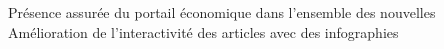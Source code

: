 \documentclass[30pt, french]{tccv}
\begin{document}
\begin{upshape}
\begin{textblock}{13}
\begin{mdframed}
\begin{eventlist}
 Présence assurée du portail économique dans l’ensemble des nouvelles
\makebox[1.4cm][l]{}           Amélioration de l’interactivité des articles avec des infographies

   


\end{eventlist}


\end{mdframed}
\end{textblock}

\end{upshape}
\end{document}
